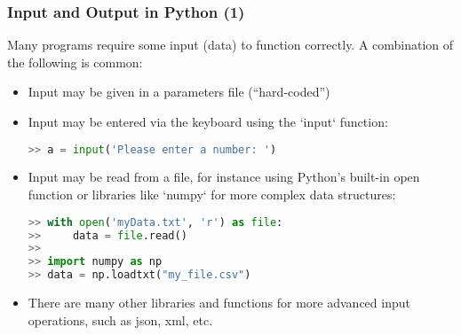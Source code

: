
\begin{frame}[fragile]
  \frametitle{Input and Output in Python (1)}
  Many programs require some input (data) to function correctly. A combination of the following is common:
  \begin{itemize}[<+->]
    \item Input may be given in a parameters file (``hard-coded'')
    \item Input may be entered via the keyboard using the `input` function:
    \begin{lstlisting}[language=Python,numbers=none]
>> a = input('Please enter a number: ')
    \end{lstlisting}
    \item Input may be read from a file, for instance using Python's built-in open function or libraries like `numpy` for more complex data structures:
    \begin{lstlisting}[language=Python,numbers=none]
>> with open('myData.txt', 'r') as file:
>>     data = file.read()
>> 
>> import numpy as np
>> data = np.loadtxt("my_file.csv")
    \end{lstlisting}
    \item There are many other libraries and functions for more advanced input operations, such as json, xml, etc.
  \end{itemize}
 \end{frame}

